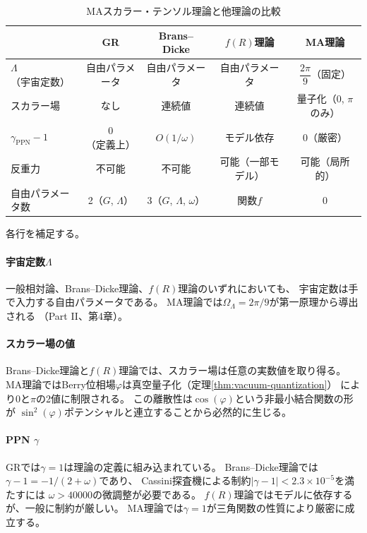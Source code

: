 \begin{table}[htbp]
\centering
\caption{MAスカラー・テンソル理論と他理論の比較}
\label{tab:theory-comparison}
\renewcommand{\arraystretch}{1.5}
\begin{tabular}{@{}lcccc@{}}
\toprule
& \textbf{GR} & \textbf{Brans--Dicke} & \textbf{$f(R)$理論} & \textbf{MA理論} \\
\midrule
$\Lambda$（宇宙定数）
  & 自由パラメータ & 自由パラメータ & 自由パラメータ
  & $\dfrac{2\pi}{9}$（固定） \\[6pt]
スカラー場
  & なし & 連続値 & 連続値
  & 量子化（$0$, $\pi$のみ） \\[4pt]
$\gamma_{\mathrm{PPN}} - 1$
  & $0$（定義上） & $O(1/\omega)$ & モデル依存
  & $0$（厳密） \\[4pt]
反重力
  & 不可能 & 不可能 & 可能（一部モデル）
  & 可能（局所的） \\[4pt]
自由パラメータ数
  & 2（$G$, $\Lambda$） & 3（$G$, $\Lambda$, $\omega$） & 関数$f$
  & 0 \\[4pt]
\bottomrule
\end{tabular}
\end{table}

各行を補足する。

\paragraph{宇宙定数$\Lambda$}
一般相対論、Brans--Dicke理論、$f(R)$理論のいずれにおいても、
宇宙定数は手で入力する自由パラメータである。
MA理論では$\Omega_\Lambda = 2\pi/9$が第一原理から導出される
（Part II、第4章）。

\paragraph{スカラー場の値}
Brans--Dicke理論と$f(R)$理論では、スカラー場は任意の実数値を取り得る。
MA理論ではBerry位相場$\varphi$は真空量子化（定理\ref{thm:vacuum-quantization}）
により$0$と$\pi$の2値に制限される。
この離散性は$\cos(\varphi)$という非最小結合関数の形が
$\sin^2(\varphi)$ポテンシャルと連立することから必然的に生じる。

\paragraph{PPN $\gamma$}
GRでは$\gamma = 1$は理論の定義に組み込まれている。
Brans--Dicke理論では$\gamma - 1 = -1/(2+\omega)$であり、
Cassini探査機による制約$|\gamma-1| < 2.3\times 10^{-5}$を満たすには
$\omega > 40000$の微調整が必要である。
$f(R)$理論ではモデルに依存するが、一般に制約が厳しい。
MA理論では$\gamma = 1$が三角関数の性質により厳密に成立する。

